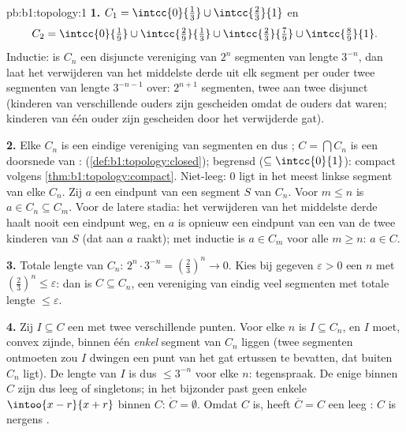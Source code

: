 \begin{solution}{pb:b1:topology:1}
\textbf{1.} $C_1 = \intcc{0}{\frac13} \cup \intcc{\frac23}{1}$ en
\[
C_2 = \intcc{0}{\tfrac19} \cup \intcc{\tfrac29}{\tfrac13}
\cup \intcc{\tfrac23}{\tfrac79} \cup \intcc{\tfrac89}{1} .
\]
Inductie: is $C_n$ een disjuncte vereniging van $2^n$  segmenten
van lengte $3^{-n}$, dan laat het verwijderen van het  middelste
derde uit elk segment per ouder twee  segmenten van lengte
$3^{-n-1}$ over: $2^{n+1}$ segmenten, twee aan twee disjunct (kinderen
van verschillende ouders zijn gescheiden omdat de ouders dat waren;
kinderen van één ouder zijn gescheiden door het verwijderde gat).

\textbf{2.} Elke $C_n$ is een eindige vereniging van segmenten en dus
; $C = \bigcap C_n$ is een doorsnede van :
 (\cref{def:b1:topology:closed}); begrensd ($\subseteq
\intcc{0}{1}$): compact volgens \cref{thm:b1:topology:compact}.
Niet-leeg: $0$ ligt in het meest linkse segment van elke $C_n$. Zij $a$
een eindpunt van een segment $S$ van $C_n$. Voor $m \leq n$ is $a \in C_n
\subseteq C_m$. Voor de latere stadia: het verwijderen van het middelste
derde haalt nooit een eindpunt weg, en $a$ is opnieuw een eindpunt van
een van de twee kinderen van $S$ (dat aan $a$ raakt); met inductie is $a
\in C_m$ voor alle $m \geq n$: $a \in C$.

\textbf{3.} Totale lengte van $C_n$: $2^n \cdot 3^{-n} = (\frac23)^n \to
0$. Kies bij gegeven $\varepsilon > 0$ een $n$ met $(\frac23)^n \leq
\varepsilon$: dan is $C \subseteq C_n$, een vereniging van eindig veel
segmenten met totale lengte $\leq \varepsilon$.

\textbf{4.} Zij $I \subseteq C$ een  met twee verschillende
punten. Voor elke $n$ is $I \subseteq C_n$, en $I$ moet, convex zijnde,
binnen één \emph{enkel} segment van $C_n$ liggen (twee segmenten
ontmoeten zou $I$ dwingen een punt van het gat ertussen te bevatten, dat
buiten $C_n$ ligt). De lengte van $I$ is dus $\leq 3^{-n}$ voor elke $n$:
tegenspraak. De enige  binnen $C$ zijn dus leeg of singletons;
in het bijzonder past geen enkele $\intoo{x-r}{x+r}$ binnen $C$:
$\mathring C = \emptyset$. Omdat $C$  is, heeft $\overline C = C$
een leeg : $C$ is nergens .


\end{solution}
